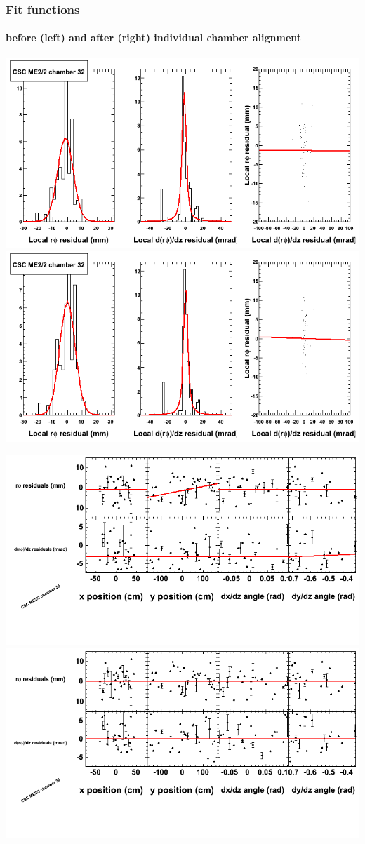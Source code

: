 \documentclass[compress]{beamer}
\begin{document}
\begin{frame}
\frametitle{Fit functions}
\framesubtitle{before (left) and after (right) individual chamber alignment}
\includegraphics[width=0.5\linewidth]{ringfits_3dof/beforefit_MEp22_32_bellcurve.png} \includegraphics[width=0.5\linewidth]{ringfits_3dof/afterfit_MEp22_32_bellcurve.png}

\includegraphics[width=0.5\linewidth]{ringfits_3dof/beforefit_MEp22_32_polynomials.png} \includegraphics[width=0.5\linewidth]{ringfits_3dof/afterfit_MEp22_32_polynomials.png}
\end{frame}
\end{document}
